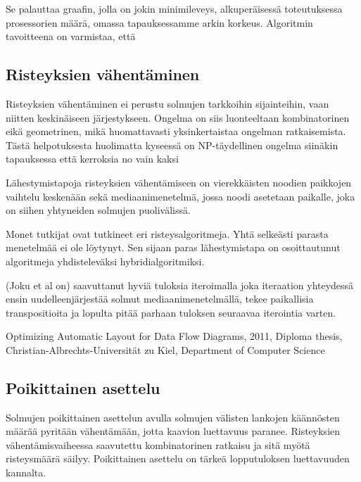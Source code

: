 \documentclass[finnish,12pt]{article}
\begin{document}
Se palauttaa graafin, jolla on jokin minimileveys, alkuperäisessä toteutuksessa prosessorien määrä, omassa tapauksessamme arkin korkeus. 
Algoritmin tavoitteena on varmistaa, että 


		\subsection{Risteyksien vähentäminen}

Risteyksien vähentäminen ei perustu solmujen tarkkoihin sijainteihin, vaan niitten keskinäiseen järjestykseen. Ongelma on siis luonteeltaan kombinatorinen eikä geometrinen, mikä huomattavasti yksinkertaistaa ongelman ratkaisemista. Tästä helpotuksesta huolimatta kyseessä on NP-täydellinen ongelma siinäkin tapauksessa että kerroksia no vain kaksi \cite{RefWorks:40}

Lähestymistapoja risteyksien vähentämiseen on vierekkäisten noodien paikkojen vaihtelu keskenään sekä mediaanimenetelmä, jossa noodi asetetaan paikalle, joka on siihen yhtyneiden solmujen puolivälissä.

Monet tutkijat ovat
tutkineet eri risteysalgoritmeja. Yhtä selkeästi parasta menetelmää ei ole löytynyt. Sen sijaan paras lähestymistapa on osoittautunut algoritmeja yhdisteleväksi hybridialgoritmiksi.

(Joku et al on) saavuttanut hyviä tuloksia iteroimalla joka iteraation yhteydessä ensin uudelleenjärjestää solmut mediaanimenetelmällä, tekee paikallisia transpositioita ja lopulta pitää parhaan tuloksen seuraavaa iterointia varten.


Optimizing Automatic Layout for Data Flow Diagrams, 2011, Diploma thesis, Christian-Albrechts-Universität zu Kiel, Department of Computer Science

		\subsection{Poikittainen asettelu}

Solmujen poikittainen asettelun avulla solmujen välisten lankojen käännösten määrää pyritään vähentämään, jotta kaavion luettavuus paranee.
Risteyksien vähentämisvaiheessa saavutettu kombinatorinen ratkaisu ja sitä myötä risteysmäärä säilyy.
Poikittainen asettelu on tärkeä lopputuloksen luettavuuden kannalta.


\makeindex %
 
\end{document}

